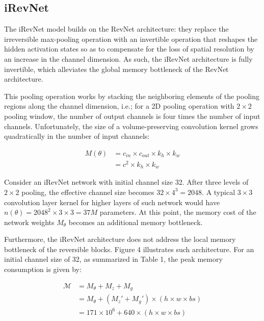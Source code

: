 \documentclass[twocolumn]{bmcart}
\begin{document}
\subsection{iRevNet}

The iRevNet model builds on the RevNet architecture: they replace the irreversible max-pooling operation with an invertible operation that reshapes the hidden activation states
so as to compensate for the loss of spatial resolution by an increase in the channel dimension.
As such, the iRevNet architecture is fully invertible, which alleviates the global memory bottleneck of the RevNet architecture.

This pooling operation works by stacking the neighboring elements of the pooling regions along the channel dimension,
i.e.; for a 2D pooling operation with $2 \times 2$ pooling window, the number of output channels is four times the number of input channels.
Unfortunately, the size of a volume-preserving convolution kernel grows quadratically in the number of input channels:

\begin{subequations}
\begin{align}
M(\theta) &= c_{in} \times c_{out} \times k_h \times k_w \\
          &= c^2 \times k_h \times k_w
\end{align}
\end{subequations}

Consider an iRevNet network with initial channel size 32.
After three levels of $2 \times 2$ pooling, the effective channel size becomes $32 \times 4^3=2048$. A typical $3 \times 3$ convolution layer kernel for higher layers of such network would have $n(\theta)=2048^2 \times 3 \times 3=37M$ parameters.
At this point, the memory cost of the network weights $M_{\theta}$ becomes an additional memory bottleneck.

Furthermore, the iRevNet architecture does not address the local memory bottleneck of the reversible blocks.
Figure 4 illustrates such architecture.
For an initial channel size of 32, as summarized in Table 1, the peak memory consumption is given by:

\begin{subequations}
\begin{align}
\mathcal{M} &= M_{\theta} + M_{z} + M_{g} \\
            &= M_{\theta} + (M_z' + M_{g}') \times (h \times w \times bs) \\
            &= 171 \times 10^6 + 640 \times (h \times w \times bs)
\end{align}
\end{subequations}
\end{document}
